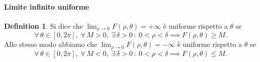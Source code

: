 \documentclass{article}
\theoremstyle{plain}
\theoremstyle{definition}
\newtheorem{defn}{Definition}[section]
\theoremstyle{remark}
\begin{document}
\paragraph{Limite infinito uniforme}
\begin{bxthm}
\begin{defn}
    Si dice che $\lim_{\rho\to0}F(\rho,\theta)=+\infty$ è uniforme rispetto a $\theta$ se
    \[\forall\,\theta\in[0,2\pi],\;\forall\, M>0,\;\exists\,\delta>0\, :\; 0<\rho<\delta\implies F(\rho,\theta)\geq M.\]
    Allo stesso modo abbiamo che $\lim_{\rho\to0}F(\rho,\theta)=-\infty$ è uniforme rispetto a $\theta$ se
    \[\forall\,\theta\in[0,2\pi],\;\forall\, M<0,\;\exists\,\delta>0\, :\; 0<\rho<\delta\implies F(\rho,\theta)\leq M.\]
\end{defn}
\end{bxthm}

\vspace{10pt}
\end{document}
